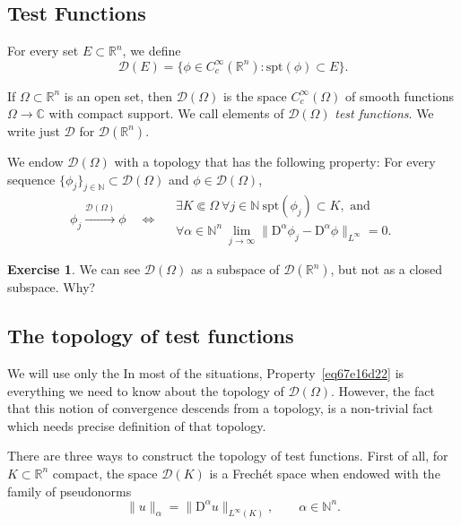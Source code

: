 \documentclass[a4paper,9pt]{amsart}
\newcommand{\scr}[1]{\mathscr{#1}}
\newcommand{\N}{\mathbb{N}}	%
\newcommand{\R}{\mathbb{R}}	%
\newcommand{\C}{\mathbb{C}}	%
\newcommand{\Diff}{\mathrm{D}}
\newcommand{\IFF}{\Leftrightarrow}	%
\newcommand{\spt}{\mathrm{spt}}
\theoremstyle{plain}
\theoremstyle{definition}
\newtheorem{exercise}[proposition]{Exercise}%
\theoremstyle{remark}
\begin{document}
\subsection{Test Functions}\label{subs67def15f}

For every set $E\subset\R^n$,
we define
\begin{equation}
	\scr D(E) = \{\phi\in C^\infty_c(\R^n): \spt(\phi)\subset E \} .
\end{equation}

If $\Omega\subset\R^n$ is an open set,
then $\scr D(\Omega)$ is the space $C^\infty_c(\Omega)$ of smooth functions $\Omega\to\C$ with compact support.
We call elements of $\scr D(\Omega)$ \emph{test functions}.
We write just $\scr D$ for $\scr D(\R^n)$.

We endow $\scr D(\Omega)$ with a topology that has the following property:
For every sequence $\{\phi_j\}_{j\in\N}\subset\scr D(\Omega)$ and $\phi\in\scr D(\Omega)$,
\begin{equation}\label{eq67e16d22}
	\phi_j\overset{\scr D(\Omega)}\longrightarrow \phi
	\quad\IFF\quad
	\begin{array}{c}
		\exists K\Subset\Omega\ \forall j\in\N\ \spt(\phi_j)\subset K ,\text{ and }\\
		\forall \alpha\in\N^n\ \lim_{j\to\infty}\|\Diff^\alpha\phi_j-\Diff^\alpha\phi\|_{L^\infty} = 0 .
	\end{array}
\end{equation}

\begin{exercise}
	We can see $\scr D(\Omega)$ as a subspace of $\scr D(\R^n)$, but not as a closed subspace.
	Why?
\end{exercise}

\subsection{The topology of test functions}\label{subs67e16d33}
We will use only the 
In most of the situations,
Property~\eqref{eq67e16d22} is everything we need to know about the topology of $\scr D(\Omega)$.
However, the fact that this notion of convergence descends from a topology, is a non-trivial fact which needs precise definition of that topology.

There are three ways to construct the topology of test functions.
First of all, for $K\subset\R^n$ compact, the space $\scr D(K)$ is a Frechét space when endowed with the family of pseudonorms 
\begin{equation}
	\|u\|_\alpha = \|\Diff^\alpha u\|_{L^\infty(K)} ,
	\qquad\alpha\in\N^n . 
\end{equation}
\end{document}
